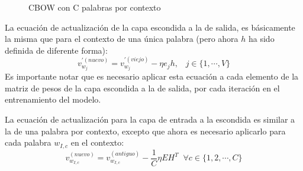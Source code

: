 \begin{figure}
  \caption{CBOW con C palabras por contexto}
  \label{redneuronal:4}
\end{figure}

La ecuación de actualización de la capa escondida a la de salida, es básicamente la misma que para el contexto de una
única palabra (pero ahora $h$ ha sido definida de diferente forma):
\begin{equation}
  v_{w_j}^{'(nuevo)}=v_{w_j}^{'(viejo)} - \eta e_j h, \;\;\; j \in \{1, \cdots, V\}
\end{equation}
Es importante notar que es necesario aplicar esta ecuación a cada elemento de la matriz de pesos de la capa escondida a la de salida,
por cada iteración en el entrenamiento del modelo.

La ecuación de actualización para la capa de entrada a la escondida es similar a la de una palabra por contexto, excepto que ahora es
necesario aplicarlo para cada palabra $w_{I,c}$ en el contexto:
\begin{equation}
  v_{w_{I,c}}^{(nuevo)} = v_{w_{I,c}}^{(antiguo)} - \frac{1}{C}\eta EH^T \;\; \forall c \in \{1,2,\cdots, C \}
\end{equation}